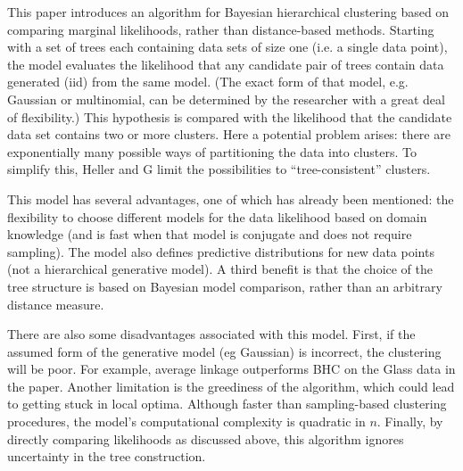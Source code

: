 \documentclass[12pt,letterpaper]{article}
\begin{document}


This paper introduces an algorithm for Bayesian hierarchical clustering based on comparing marginal likelihoods, rather than distance-based methods. Starting with a set of trees each containing data sets of size one (i.e. a single data point), the model evaluates the likelihood that any candidate pair of trees contain data generated (iid) from the same model. (The exact form of that model, e.g. Gaussian or multinomial, can be determined by the researcher with a great deal of flexibility.) This hypothesis is compared with the likelihood that the candidate data set contains two or more clusters. Here a potential problem arises: there are exponentially many possible ways of partitioning the data into clusters. To simplify this, Heller and G limit the possibilities to ``tree-consistent'' clusters. 

This model has several advantages, one of which has already been mentioned: the flexibility to choose different models for the data likelihood based on domain knowledge (and is fast when that model is conjugate and does not require sampling). The model also defines predictive distributions for new data points (not a hierarchical generative model). A third benefit is that the choice of the tree structure is based on Bayesian model comparison, rather than an arbitrary distance measure. 

There are also some disadvantages associated with this model. First, if the assumed form of the generative model (eg Gaussian) is incorrect, the clustering will be poor. For example, average linkage outperforms BHC on the Glass data in the paper. Another limitation is the greediness of the algorithm, which could lead to getting stuck in local optima. Although faster than sampling-based clustering procedures, the model's computational complexity is quadratic in $n$. Finally, by directly comparing likelihoods as discussed above, this algorithm ignores uncertainty in the tree construction. 
\end{document}
